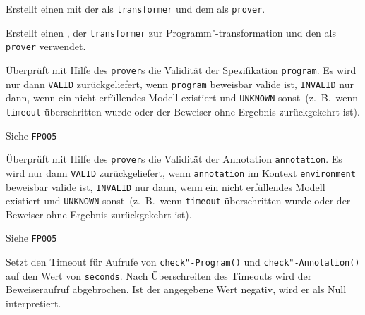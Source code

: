 \begin{description}%

    Erstellt einen  mit der
     als \texttt{transformer}
    und dem  als \texttt{prover}.%


    Erstellt einen , der
    \texttt{transformer} zur Programm"-transformation und den
     als \texttt{prover} verwendet.%


    Überprüft mit Hilfe des \texttt{prover}s die Validität der Spezifikation
    \texttt{program}. Es wird nur dann \texttt{VALID} zurückgeliefert,
    wenn \texttt{program} beweisbar valide ist, \texttt{INVALID} nur
    dann, wenn ein nicht erfüllendes Modell existiert und
    \texttt{UNKNOWN} sonst~(z.~B.\, wenn \texttt{timeout}
    überschritten wurde oder der Beweiser ohne Ergebnis zurückgekehrt
    ist).%


    Siehe \texttt{FP005}%


    Überprüft mit Hilfe des \texttt{prover}s die Validität der Annotation
    \texttt{annotation}. Es wird nur dann \texttt{VALID}
    zurückgeliefert, wenn \texttt{annotation} im Kontext
    \texttt{environment} beweisbar valide ist, \texttt{INVALID} nur
    dann, wenn ein nicht erfüllendes Modell existiert und
    \texttt{UNKNOWN} sonst~(z.~B.\, wenn \texttt{timeout}
    überschritten wurde oder der Beweiser ohne Ergebnis zurückgekehrt
    ist).%


    Siehe \texttt{FP005}%



    Setzt den Timeout für Aufrufe von \texttt{check"-Program()} und
    \texttt{check"-Annotation()} auf den Wert von \texttt{seconds}.
    Nach Überschreiten des Timeouts wird der Beweiseraufruf
    abgebrochen. Ist der angegebene Wert negativ, wird er als Null
    interpretiert.%

\end{description}%

